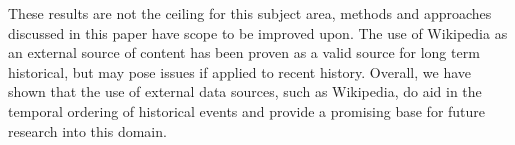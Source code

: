 \documentclass[bsc,frontabs,twoside,singlespacing,parskip,deptreport]{infthesis}     %
\begin{document}
These results are not the ceiling for this subject area, methods and approaches discussed in this paper have scope
to be improved upon. The use of Wikipedia as an external source of content has been proven as a valid source for
long term historical, but may pose issues if applied to recent history. Overall, we have shown that the use of external
data sources, such as Wikipedia, do aid in the temporal ordering of historical events and provide a promising base for future
research into this domain.


\end{document}
